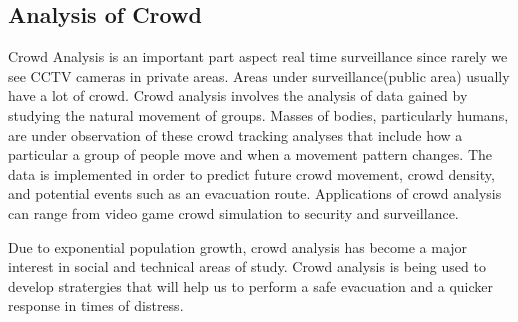 \subsection{Analysis of Crowd}
Crowd Analysis is an important part aspect real time surveillance since rarely we see CCTV cameras in private areas. Areas under surveillance(public area) usually have a lot of crowd.
Crowd analysis involves the analysis of data gained by studying the natural
movement of groups. Masses of bodies, particularly humans, are under observation
of these crowd tracking analyses that include how a particular a group of people move and when a
movement pattern changes. The data is implemented in order to predict future crowd
movement, crowd density, and potential events such as an evacuation route.
Applications of crowd analysis can range from video game crowd simulation to security
and surveillance.
\par
Due to exponential population growth, crowd analysis has become a major interest in social
and technical areas of study. Crowd analysis is being used to develop stratergies that will help us to perform a safe evacuation and a quicker response in times of distress. 
